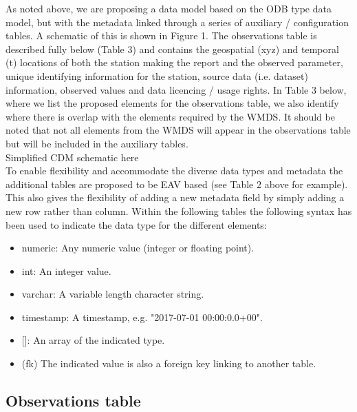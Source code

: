 \documentclass[a4paper]{article}
\begin{document}
As noted above, we are proposing a data model based on the ODB type data model, but with the metadata linked through a series of auxiliary / configuration tables. A schematic of this is shown in Figure 1. The observations table is described fully below (Table 3) and contains the geospatial (xyz) and temporal (t) locations of both the station making the report and the observed parameter, unique identifying information for the station, source data (i.e. dataset) information, observed values and data licencing / usage rights. In Table 3 below, where we list the proposed elements for the observations table, we also identify where there is overlap with the elements required by the WMDS. It should be noted that not all elements from the WMDS will appear in the observations table but will be included in the auxiliary tables. \\

Simplified CDM schematic here\\

To enable flexibility and accommodate the diverse data types and metadata the additional tables are proposed to be EAV based (see Table 2 above for example). This also gives the flexibility of adding a new metadata field by simply adding a new row rather than column. Within the following tables the following syntax has been used to indicate the data type for the different elements: \\
\begin{itemize}
\item numeric: \tabto{3 cm} Any numeric value (integer or floating point).
\item int: \tabto{3 cm} An integer value.
\item varchar: \tabto{3 cm} A variable length character string.
\item timestamp: \tabto{3 cm} A timestamp, e.g. "2017-07-01 00:00:0.0+00".
\item {[]}:\tabto{3 cm} An array of the indicated type.
\item (fk)  \tabto{3 cm} The indicated value is also a foreign key linking to another table.
\end {itemize}

%



\subsection {Observations table}
\end{document}
